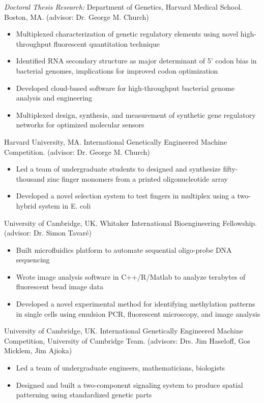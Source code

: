 \documentclass[11pt, letterpaper]{article}
\newcommand{\years}[1]{\marginnote{\scriptsize #1}}
\begin{document}
\noindent\years{2010-}
\emph{Doctoral Thesis Research:} Department of Genetics, Harvard Medical School. Boston, MA. (advisor: Dr. George M. Church)
\begin{itemize}
	\item Multiplexed characterization of genetic regulatory elements using novel high-throughput fluorescent quantitation technique
	\item Identified RNA secondary structure as major determinant of 5' codon bias in bacterial genomes, implications for improved codon optimization
    \item Developed cloud-based software for high-throughput bacterial genome analysis and engineering
    \item Multiplexed design, synthesis, and measurement of synthetic gene regulatory networks for optimized molecular sensors\\[5mm]
\end{itemize}

\noindent\years{2011}
Harvard University, MA. International Genetically Engineered Machine Competition. (advisor: Dr. George M. Church)
\begin{itemize}
    \item Led a team of undergraduate students to designed and synthesize fifty-thousand zinc finger monomers from a printed oligonucleotide array
    \item Developed a novel selection system to test fingers in multiplex using a two-hybrid system in E. coli
\end{itemize}

\noindent\years{2008-2009}
University of Cambridge, UK. Whitaker International Bioengineering Fellowship. (advisor: Dr. Simon Tavaré)
\begin{itemize}
    \item Built microfluidics platform to automate sequential oligo-probe DNA sequencing
    \item Wrote image analysis software in C++/R/Matlab to analyze terabytes of fluorescent bead image data
    \item Developed a novel experimental method for identifying methylation patterns in single cells using emulsion PCR, fluorescent microscopy, and image analysis
\end{itemize}

\noindent\years{2008}
University of Cambridge, UK. International Genetically Engineered Machine Competition, University of Cambridge Team.  (advisors: Drs. Jim Haseloff, Gos Micklem, Jim Ajioka)
\begin{itemize}
    \item Led a team of undergraduate engineers, mathematicians, biologists
    \item Designed and built a two-component signaling system to produce spatial patterning using standardized genetic parts
\end{itemize}
\end{document}
